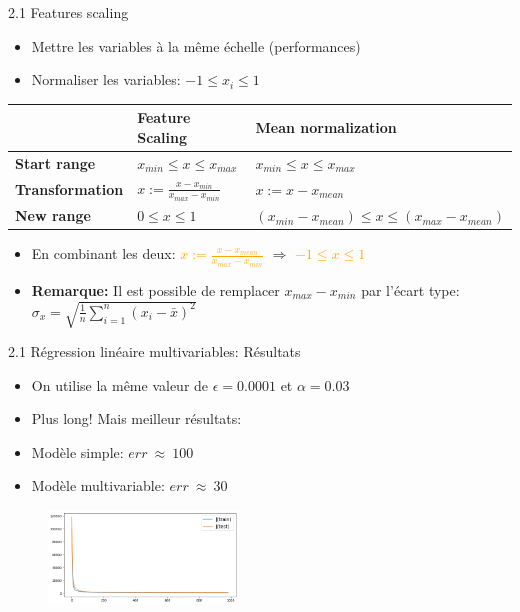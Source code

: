 \begin{frame}{2.1 Features scaling}
  \begin{itemize}
  \item Mettre les variables à la même échelle (performances)
  \item Normaliser les variables: $-1 \leq x_{i} \leq 1$
  \end{itemize}
  \vspace{-0.2cm}
  \begin{table}
    \footnotesize
        {\def\arraystretch{2}\tabcolsep=8pt
          \begin{tabular}{l|l|l}
            & \textbf{Feature Scaling} & \textbf{Mean normalization}\\
            \hline
            \textbf{Start range} & $x_{min} \leq x \leq x_{max}$ & $x_{min} \leq x \leq x_{max}$ \\
            \textbf{Transformation} & $x := \frac{x - x_{min}}{x_{max} - x_{min}}$ & $x := x - x_{mean}$ \\
            \textbf{New range} & $0 \leq x \leq 1$ & $(x_{min}-x_{mean}) \leq x \leq (x_{max}-x_{mean})$
          \end{tabular}
        }
  \end{table}
  \vspace{-0.2cm}
  \begin{itemize}
  \item En combinant les deux: \boldmath \textcolor{orange}{$x := \frac{x - x_{mean}}{x_{max} - x_{min}}$} $\Rightarrow$ \textcolor{orange}{$-1 \leq x \leq 1$} 
    \vspace{0.2cm}
    \footnotesize
  \item\textbf{Remarque:} Il est possible de remplacer $x_{max} - x_{min}$ par l'écart type: $\sigma_{x} = \sqrt{\frac{1}{n}\displaystyle\sum_{i=1}^{n}(x_{i} - \bar{x})^{2}}$
  \end{itemize}
\end{frame}

\begin{frame}{2.1 Régression linéaire multivariables: Résultats}
  \begin{itemize}
  \item On utilise la même valeur de $\epsilon = 0.0001$ et $\alpha = 0.03$
  \item Plus long! Mais meilleur résultats:
  \item Modèle simple: $err ~ \approx ~ 100$
  \item Modèle multivariable: $err ~ \approx ~ 30$
  \end{itemize}
  \begin{figure}
    \includegraphics[width=0.45\textwidth]{figs/multiVarDesc.png}\\
  \end{figure}
\end{frame}
  
